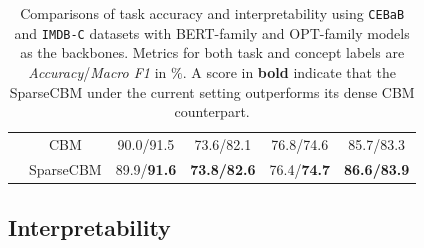 \documentclass[letterpaper]{article} %
\begin{document}
\begin{table}[t]
\begin{tabular}{cccccc}
                                     & CBM                                 & 90.0/91.5                     & 73.6/82.1                     &   76.8/74.6                              &      85.7/83.3                           \\
                                     & SparseCBM                           & 89.9/\textbf{91.6}            & \textbf{73.8/82.6}            &   76.4/\textbf{74.7}                              &      \textbf{86.6/83.9}                           \\ \bottomrule
\end{tabular}
\caption{Comparisons of task accuracy and interpretability using \texttt{CEBaB} and \texttt{IMDB-C} datasets with BERT-family and OPT-family models as the backbones. Metrics for both task and concept labels are \textit{Accuracy}/\textit{Macro F1} in $\%$. A score in \textbf{bold} indicate that the SparseCBM under the current setting outperforms its dense CBM counterpart.}\label{tab:compare}
\end{table}

\subsection{Interpretability}
\end{document}
